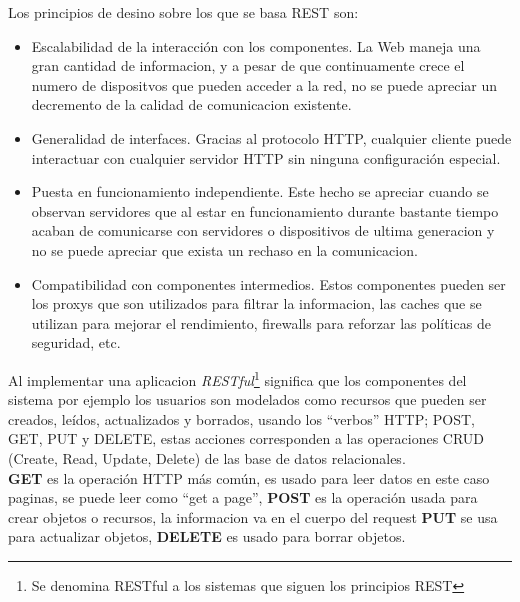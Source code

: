 Los principios de desino sobre los que se basa REST son:
\begin{itemize}
  \item Escalabilidad de la interacción con los componentes. La Web maneja una gran cantidad de informacion, y a pesar de que continuamente crece el numero de dispositvos que pueden acceder a la red, no se puede apreciar un decremento de la calidad de comunicacion existente.

  \item Generalidad de interfaces. Gracias al protocolo HTTP, cualquier cliente puede interactuar con cualquier servidor HTTP sin ninguna configuración especial.

  \item Puesta en funcionamiento independiente. Este hecho se apreciar cuando se observan servidores que al estar en funcionamiento durante bastante tiempo acaban de comunicarse con servidores o dispositivos de ultima generacion y no se puede apreciar que exista un rechaso en la comunicacion.

  \item Compatibilidad con componentes intermedios. Estos componentes pueden ser los proxys que son utilizados para filtrar la informacion, las caches que se utilizan para mejorar el rendimiento, firewalls para reforzar las políticas de seguridad, etc. \cite{rest_web_service}

\end{itemize}

 Al implementar una aplicacion \emph{RESTful}\footnote{Se denomina RESTful a los sistemas que siguen los principios REST} significa que los componentes del sistema por ejemplo los usuarios son modelados como recursos que pueden ser creados, leídos, actualizados y borrados, usando los ``verbos'' HTTP; POST, GET, PUT y DELETE, estas acciones corresponden a las operaciones CRUD (Create, Read, Update, Delete) de las base de datos relacionales.\\



\textbf{GET} es la operación HTTP más común, es usado para leer
datos en este caso paginas, se puede leer como ``get a page'',
\textbf{POST} es la operación usada para crear objetos o recursos, la informacion va en el cuerpo del request
\textbf{PUT} se usa para actualizar objetos,
\textbf{DELETE} es usado para borrar objetos. \\

